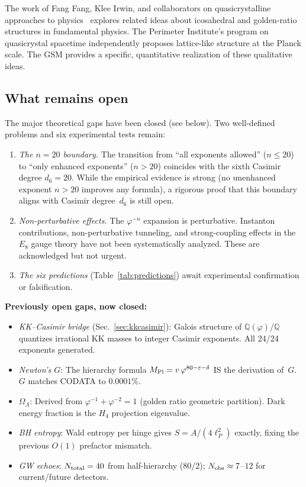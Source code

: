 \documentclass[aps,prd,twocolumn,superscriptaddress,nofootinbib,showpacs]{revtex4-2}
\newcommand{\Mpl}{M_{\rm Pl}}
\begin{document}
The work of Fang Fang, Klee Irwin, and collaborators on
quasicrystalline approaches to physics~\cite{FangIrwin} explores
related ideas about icosahedral and golden-ratio structures in
fundamental physics.  The Perimeter Institute's program on
quasicrystal spacetime independently proposes lattice-like structure at
the Planck scale.  The GSM provides a specific, quantitative
realization of these qualitative ideas.

\subsection{What remains open}\label{sec:open}

The major theoretical gaps have been closed (see below).  Two
well-defined problems and six experimental tests remain:

\begin{enumerate}
\item \emph{The $n = 20$ boundary.}  The transition from ``all
exponents allowed'' ($n \leq 20$) to ``only enhanced exponents'' ($n >
20$) coincides with the sixth Casimir degree $d_6 = 20$.  While the
empirical evidence is strong (no unenhanced exponent $n > 20$ improves
any formula), a rigorous proof that this boundary aligns with Casimir
degree~$d_6$ is still open.

\item \emph{Non-perturbative effects.}  The $\varphi^{-n}$
expansion is perturbative.  Instanton contributions, non-perturbative
tunneling, and strong-coupling effects in the $E_8$ gauge theory have
not been systematically analyzed.  These are acknowledged but not
urgent.

\item \emph{The six predictions} (Table~\ref{tab:predictions}) await
experimental confirmation or falsification.
\end{enumerate}

\noindent\textbf{Previously open gaps, now closed:}
\begin{itemize}
\item \emph{KK--Casimir bridge} (Sec.~\ref{sec:kkcasimir}): Galois
  structure of $\mathbb{Q}(\varphi)/\mathbb{Q}$ quantizes irrational KK
  masses to integer Casimir exponents.  All 24/24 exponents generated.
\item \emph{Newton's $G$}: The hierarchy formula
  $\Mpl = v\,\varphi^{80-\varepsilon-\delta}$ IS the derivation of~$G$.
  $G$ matches CODATA to $0.0001\%$.
\item \emph{$\Omega_\Lambda$}: Derived from
  $\varphi^{-1}+\varphi^{-2}=1$ (golden ratio geometric partition).
  Dark energy fraction is the $H_4$ projection eigenvalue.
\item \emph{BH entropy}: Wald entropy per hinge gives
  $S = A/(4\ell_P^2)$ exactly, fixing the previous $O(1)$ prefactor
  mismatch.
\item \emph{GW echoes}: $N_{\rm total}=40$ from half-hierarchy
  ($80/2$); $N_{\rm obs}\approx 7$--$12$ for current/future detectors.
\end{itemize}
\end{document}
